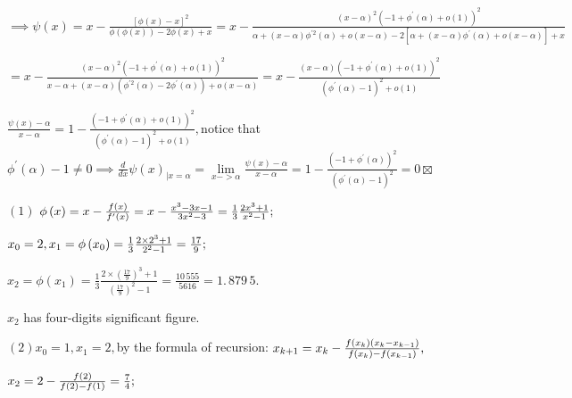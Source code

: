 \documentclass{article}
\begin{document}
$\implies \psi \left( x\right) =x-\frac{\left[ \phi \left( x\right) -x\right]
^{2}}{\phi \left( \phi \left( x\right) \right) -2\phi \left( x\right) +x}=x-%
\frac{\left( x-\alpha \right) ^{2}\left( -1+\phi ^{\prime }\left( \alpha
\right) +o\left( 1\right) \right) ^{2}}{\alpha +\left( x-\alpha \right) \phi
^{\prime 2}\left( \alpha \right) +o(x-\alpha )-2\left[ \alpha +\left(
x-\alpha \right) \phi ^{\prime }\left( \alpha \right) +o(x-\alpha )\right] +x%
}$

$=x-\frac{\left( x-\alpha \right) ^{2}\left( -1+\phi ^{\prime }\left( \alpha
\right) +o\left( 1\right) \right) ^{2}}{x-\alpha +\left( x-\alpha \right)
(\phi ^{\prime 2}\left( \alpha \right) -2\phi ^{\prime }\left( \alpha
\right) )+o(x-\alpha )}=x-\frac{\left( x-\alpha \right) \left( -1+\phi
^{\prime }\left( \alpha \right) +o\left( 1\right) \right) ^{2}}{\left( \phi
^{\prime }\left( \alpha \right) -1\right) ^{2}+o(1)}$

$\frac{\psi \left( x\right) -\alpha }{x-\alpha }=1-\frac{\left( -1+\phi
^{\prime }\left( \alpha \right) +o\left( 1\right) \right) ^{2}}{\left( \phi
^{\prime }\left( \alpha \right) -1\right) ^{2}+o(1)},$notice that $\phi
^{\prime }\left( \alpha \right) -1\neq 0\implies \frac{d}{dx}\psi \left(
x\right) _{|x=\alpha }=\underset{x->\alpha }{\lim }\frac{\psi \left(
x\right) -\alpha }{x-\alpha }=1-\frac{\left( -1+\phi ^{\prime }\left( \alpha
\right) \right) ^{2}}{\left( \phi ^{\prime }\left( \alpha \right) -1\right)
^{2}}=0\boxtimes $


$\left( 1\right) $ $\phi \left( x\right) =x-\frac{f\left( x\right) }{%
f^{\prime }\left( x\right) }=x-\frac{x^{3}-3x-1}{3x^{2}-3}=\allowbreak \frac{%
1}{3}\frac{2x^{3}+1}{x^{2}-1};$

$x_{0}=2,x_{1}=\phi \left( x_{0}\right) =\allowbreak \frac{1}{3}\frac{%
2\times 2^{3}+1}{2^{2}-1}=\allowbreak \frac{17}{9};$

$x_{2}=\phi \left( x_{1}\right) =\allowbreak \frac{1}{3}\frac{2\times \left( 
\frac{17}{9}\right) ^{3}+1}{\left( \frac{17}{9}\right) ^{2}-1}=\allowbreak 
\frac{10\,555}{5616}=\allowbreak 1.\,\allowbreak 879\,5.$

$x_{2}$ has four-digits significant figure.

$\left( 2\right) x_{0}=1,x_{1}=2,$by the formula of recursion: $%
x_{k+1}=x_{k}-\frac{f\left( x_{k}\right) \left( x_{k}-x_{k-1}\right) }{%
f\left( x_{k}\right) -f\left( x_{k-1}\right) },$

$x_{2}=2-\frac{f\left( 2\right) }{f\left( 2\right) -f\left( 1\right) }=\frac{%
7}{4};$
\end{document}
